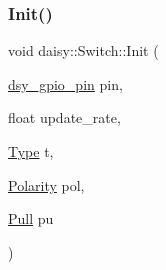 \subsubsection{\texorpdfstring{Init()}{Init()}}
{\footnotesize\ttfamily void daisy\+::\+Switch\+::\+Init (\begin{DoxyParamCaption}\item[{\hyperlink{structdsy__gpio__pin}{dsy\+\_\+gpio\+\_\+pin}}]{pin,  }\item[{float}]{update\+\_\+rate,  }\item[{\hyperlink{classdaisy_1_1_switch_a944058682bae079439ddddd42302b483}{Type}}]{t,  }\item[{\hyperlink{classdaisy_1_1_switch_aef37136dd1b4cd077ef82a0f62bcfa3d}{Polarity}}]{pol,  }\item[{\hyperlink{classdaisy_1_1_switch_aa6c26cb923638a248a1d8d3cb1755e51}{Pull}}]{pu }\end{DoxyParamCaption})}

